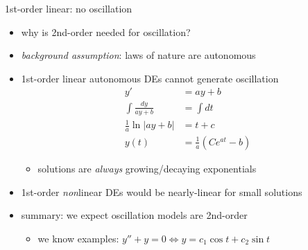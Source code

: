 \documentclass[dvipsnames,colorlinks]{beamer}
\begin{document}
\begin{frame}{1st-order linear: no oscillation}

\begin{itemize}
\item why is 2nd-order needed for oscillation?
\item \emph{background assumption}: laws of nature are autonomous
\item 1st-order linear autonomous DEs cannot generate oscillation \small
\begin{align*}
y' &= a y + b \\
\int \frac{dy}{ay+b} &= \int dt \\
\frac{1}{a} \ln|ay+b| &= t+c \\
y(t) &= \frac{1}{a}\left(C e^{at} - b\right)
\end{align*}

\vspace{-3mm}
    \begin{itemize}
    \item solutions are \emph{always} growing/decaying exponentials
    \end{itemize}
\item 1st-order \emph{non}linear DEs would be nearly-linear for small solutions
\item summary: we expect oscillation models are 2nd-order
    \begin{itemize}
    \item we know examples: \footnotesize $y'' + y = 0 \iff y = c_1 \cos t + c_2 \sin t$
    \end{itemize}
\end{itemize}
\end{frame}
\end{document}
